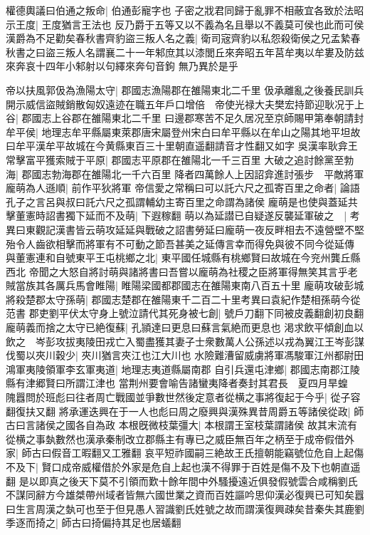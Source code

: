 權德輿議曰伯通之叛命|{
	伯通彭寵字也}
子密之戕君同歸于亂罪不相蔽宜各致於法昭示王度|{
	王度猶言王法也}
反乃爵于五等又以不義為名且舉以不義莫可侯也此而可侯漢爵為不足勸矣春秋書齊豹盜三叛人名之義|{
	衛司宼齊豹以私怨殺衛侯之兄孟縶春秋書之曰盜三叛人名謂襄二十一年邾庶其以漆閭丘來奔昭五年莒牟夷以牟婁及防兹來奔哀十四年小邾射以句繹來奔句音鉤}
無乃異於是乎

帝以扶風郭伋為漁陽太守|{
	郡國志漁陽郡在雒陽東北二千里}
伋承離亂之後養民訓兵開示威信盜賊銷散匈奴遠迹在職五年戶口增倍　帝使光禄大夫樊宏持節迎耿况于上谷|{
	郡國志上谷郡在雒陽東北二千里}
曰邊郡寒苦不足久居况至京師賜甲第奉朝請封牟平侯|{
	地理志牟平縣屬東萊郡唐宋屬登州宋白曰牟平縣以在牟山之陽其地平坦故曰牟平漢牟平故城在今黄縣東百三十里朝直遥翻請音才性翻又如字}
吳漢率耿弇王常擊富平獲索賊于平原|{
	郡國志平原郡在雒陽北一千三百里}
大破之追討餘黨至勃海|{
	郡國志勃海郡在雒陽北一千六百里}
降者四萬餘人上因詔弇進討張步　平敵將軍龐萌為人遜順|{
	前作平狄將軍}
帝信愛之常稱曰可以託六尺之孤寄百里之命者|{
	論語孔子之言呂與叔曰託六尺之孤謂輔幼主寄百里之命謂為諸侯}
龐萌是也使與蓋延共擊董憲時詔書獨下延而不及萌|{
	下遐稼翻}
萌以為延譛已自疑遂反襲延軍破之　|{
	考異曰東觀記漢書皆云萌攻延延與戰破之詔書勞延曰龐萌一夜反畔相去不遠營壁不堅殆令人齒欲相擊而將軍有不可動之節吾甚美之延傳言幸而得免與彼不同今從延傳}
與董憲連和自號東平王屯桃鄉之北|{
	東平國任城縣有桃鄉賢曰故城在今兖州龔丘縣西北}
帝聞之大怒自將討萌與諸將書曰吾嘗以龐萌為社稷之臣將軍得無笑其言乎老賊當族其各厲兵馬會睢陽|{
	睢陽梁國都郡國志在雒陽東南八百五十里}
龐萌攻破彭城將殺楚郡太守孫萌|{
	郡國志楚郡在雒陽東千二百二十里考異曰袁紀作楚相孫萌今從范書}
郡吏劉平伏太守身上號泣請代其死身被七創|{
	號戶刀翻下同被皮義翻創初良翻}
龐萌義而捨之太守已絶復蘇|{
	孔頴達曰更息曰蘇言氣絶而更息也}
渇求飲平傾創血以飲之　岑彭攻拔夷陵田戎亡入蜀盡獲其妻子士衆數萬人公孫述以戎為翼江王岑彭謀伐蜀以夾川穀少|{
	夾川猶言夾江也江大川也}
水險難漕留威虜將軍馮駿軍江州都尉田鴻軍夷陵領軍李玄軍夷道|{
	地理志夷道縣屬南郡}
自引兵還屯津鄉|{
	郡國志南郡江陵縣有津郷賢曰所謂江津也}
當荆州要會喻告諸蠻夷降者奏封其君長　夏四月旱蝗　隗囂問於班彪曰往者周亡戰國並爭數世然後定意者從横之事將復起于今乎|{
	從子容翻復扶又翻}
將承運迭興在于一人也彪曰周之廢興與漢殊異昔周爵五等諸侯從政|{
	師古曰言諸侯之國各自為政}
本根旣微枝葉彊大|{
	本根謂王室枝葉謂諸侯}
故其末流有從横之事埶數然也漢承秦制改立郡縣主有專已之威臣無百年之柄至于成帝假借外家|{
	師古曰假音工暇翻又工雅翻}
哀平短祚國嗣三絶故王氏擅朝能竊號位危自上起傷不及下|{
	賢口成帝威權借於外家是危自上起也漢不得罪于百姓是傷不及下也朝直遥翻}
是以即真之後天下莫不引領而歎十餘年間中外騷擾遠近俱發假號雲合咸稱劉氏不謀同辭方今雄桀帶州域者皆無六國世業之資而百姓謳吟思仰漢必復興已可知矣囂曰生言周漢之埶可也至于但見愚人習識劉氏姓號之故而謂漢復興疎矣昔秦失其鹿劉季逐而掎之|{
	師古曰掎偏持其足也居蟻翻}
